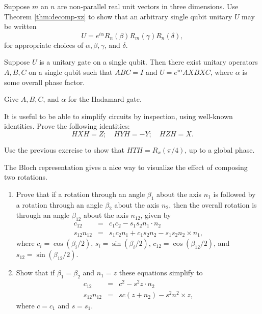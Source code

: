 \documentclass{article}
\begin{document}
\begin{exercise}
  Suppose $m$ an $n$ are non-parallel real unit vectors in three dimensions. Use Theorem \ref{thm:decomp-xz} to show that an arbitrary single qubit unitary $U$ may be written
  \[
    U=e^{i\alpha}R_n(\beta)R_m(\gamma)R_n(\delta),
  \]
  for appropriate choices of $\alpha,\beta,\gamma$, and $\delta$.
\end{exercise}

\begin{corollary}
  \label{cor:axbxc}
  Suppose $U$ is a unitary gate on a single qubit. Then there exist unitary operators $A,B,C$ on a single qubit such that $ABC=I$ and $U=e^{i\alpha}AXBXC$, where $\alpha$ is some overall phase factor.
\end{corollary}

\begin{exercise}
  Give $A,B,C$, and $\alpha$ for the Hadamard gate.
\end{exercise}

\begin{exercise}
  It is useful to be able to simplify circuits by inspection, using well-known identities. Prove the following identities:
  \[
    HXH = Z;\quad HYH=-Y;\quad HZH=X.
  \]
\end{exercise}

\begin{exercise}
  Use the previous exercise to show that $HTH=R_x(\pi/4)$, up to a global phase.
\end{exercise}

\begin{exercise}
  The Bloch representation gives a nice way to visualize the effect of composing two rotations.
  \begin{enumerate}
    \item Prove that if a rotation through an angle $\beta_1$ about the axis $n_1$ is followed by a rotation through an angle $\beta_2$ about the axis $n_2$, then the overall rotation is through an angle $\beta_{12}$ about the axis $n_{12}$, given by
    \begin{eqnarray*}
      c_{12}&=&c_1c_2-s_1s_2n_1\cdot n_2 \\
      s_{12}n_{12}&=&s_1c_2n_1+c_1s_2n_2-s_1s_2n_2\times n_1,
    \end{eqnarray*}
    where $c_i=\cos(\beta_i/2)$, $s_i=\sin(\beta_i/2)$, $c_{12}=\cos(\beta_{12}/2)$, and $s_{12}=\sin(\beta_{12}/2)$.
    \item Show that if $\beta_1=\beta_2$ and $n_1=z$ these equations simplify to
    \begin{eqnarray*}
      c_{12}&=&c^2-s^2z\cdot n_2 \\
      s_{12}n_{12}&=&sc(z+n_2)-s^2n^2\times z,
    \end{eqnarray*}
    where $c=c_1$ and $s=s_1$.
  \end{enumerate}
\end{exercise}
\end{document}
